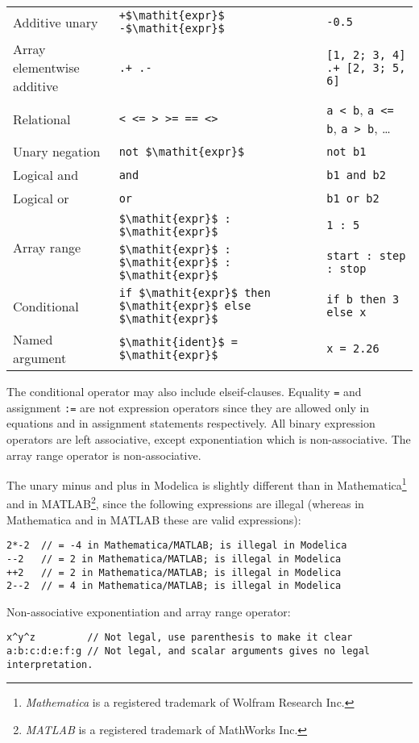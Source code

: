\begin{table}[H]
\begin{center}
\begin{tabular}{l l l}
Additive unary & \lstinline!+$\mathit{expr}$ -$\mathit{expr}$! & \lstinline!-0.5!\\
Array elementwise additive & \lstinline!.+ .-! & \lstinline![1, 2; 3, 4] .+ [2, 3; 5, 6]!\\
\hline
Relational & \lstinline!< <= > >= == <>! & \lstinline!a < b!, \lstinline!a <= b!, \lstinline!a > b!, \ldots\\
\hline
Unary negation & \lstinline!not $\mathit{expr}$! & \lstinline!not b1!\\
\hline
Logical and & \lstinline!and! & \lstinline!b1 and b2!\\
\hline
Logical or & \lstinline!or! & \lstinline!b1 or b2!\\
\hline
\multirow{2}{*}{Array range} & \lstinline!$\mathit{expr}$ : $\mathit{expr}$! & \lstinline!1 : 5!\\
                             & \lstinline!$\mathit{expr}$ : $\mathit{expr}$ : $\mathit{expr}$! & \lstinline!start : step : stop!\\
\hline
Conditional & \lstinline!if $\mathit{expr}$ then $\mathit{expr}$ else $\mathit{expr}$! & \lstinline!if b then 3 else x!\\
\hline
Named argument & \lstinline!$\mathit{ident}$ = $\mathit{expr}$! & \lstinline!x = 2.26!\\
\hline
\end{tabular}
\end{center}
\end{table}

The conditional operator may also include elseif-clauses. Equality \lstinline!=! and
assignment \lstinline!:=! are not expression operators since they are allowed only
in equations and in assignment statements respectively. All binary
expression operators are left associative, except exponentiation which
is non-associative. The array range operator is non-associative.

\begin{nonnormative}
The unary minus and plus in Modelica is slightly different than in Mathematica\footnote{\emph{Mathematica} is a registered trademark of Wolfram Research Inc.} and in MATLAB\footnote{\emph{MATLAB} is
a registered trademark of MathWorks Inc.}, since the following expressions are illegal (whereas in Mathematica and in MATLAB these are valid expressions):
\begin{lstlisting}[language=modelica]
2*-2  // = -4 in Mathematica/MATLAB; is illegal in Modelica
--2   // = 2 in Mathematica/MATLAB; is illegal in Modelica
++2   // = 2 in Mathematica/MATLAB; is illegal in Modelica
2--2  // = 4 in Mathematica/MATLAB; is illegal in Modelica
\end{lstlisting}

Non-associative exponentiation and array range operator:
\begin{lstlisting}[language=modelica]
x^y^z         // Not legal, use parenthesis to make it clear
a:b:c:d:e:f:g // Not legal, and scalar arguments gives no legal interpretation.
\end{lstlisting}
\end{nonnormative}

